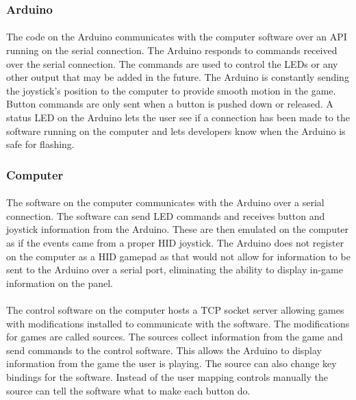\documentclass[12pt,a4paper]{article}
\begin{document}
\subsubsection{Arduino}
\paragraph{}
The code on the Arduino communicates with the computer software over an \gls{API} running on the serial connection. The Arduino responds to commands received over the serial connection. The commands are used to control the \glspl{LED} or any other output that may be added in the future. The Arduino is constantly sending the joystick's position to the computer to provide smooth motion in the game. Button commands are only sent when a button is pushed down or released. A status \gls{LED} on the Arduino lets the user see if a connection has been made to the software running on the computer and lets developers know when the Arduino is safe for flashing.
\subsubsection{Computer}
\paragraph{}
The software on the computer communicates with the Arduino over a serial connection. The software can send \gls{LED} commands and receives button and joystick information from the Arduino. These are then emulated on the computer as if the events came from a proper \gls{HID} joystick. The Arduino does not register on the computer as a \gls{HID} gamepad as that would not allow for information to be sent to the Arduino over a serial port, eliminating the ability to display in-game information on the panel.
\paragraph{}
The control software on the computer hosts a \gls{TCP} socket server allowing games with modifications installed to communicate with the software. The modifications for games are called sources. The sources collect information from the game and send commands to the control software. This allows the Arduino to display information from the game the user is playing. The source can also change key bindings for the software. Instead of the user mapping controls manually the source can tell the software what to make each button do.
\end{document}
